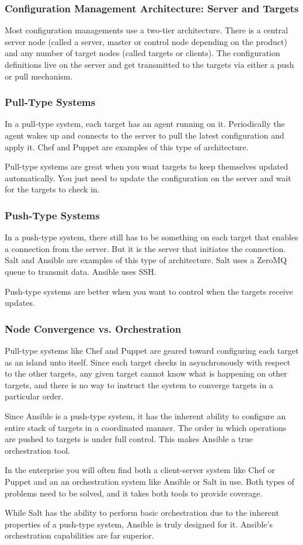 \documentclass[helvetica,english,utf8,notitle,nologo]{beamer}
\begin{document}
\begin{frame}
  \frametitle{Configuration Management Architecture: Server and Targets}

  Most configuration managements use a two-tier architecture. There is
  a central server node (called a server, master or control node
  depending on the product) and any number of target nodes (called
  targets or clients). The configuration definitions live on the
  server and get transmitted to the targets via either a push or pull
  mechanism.
\end{frame}

\begin{frame}
  \frametitle{Pull-Type Systems}

  In a pull-type system, each target has an agent running on
  it. Periodically the agent wakes up and connects to the server to
  pull the latest configuration and apply it. Chef and Puppet are
  examples of this type of architecture.

  Pull-type systems are great when you want targets to keep themselves
  updated automatically. You just need to update the configuration on
  the server and wait for the targets to check in.
\end{frame}

\begin{frame}
  \frametitle{Push-Type Systems}
  
  In a push-type system, there still has to be something on each
  target that enables a connection from the server. But it is the
  server that initiates the connection. Salt and Ansible are examples
  of this type of architecture. Salt uses a ZeroMQ queue to
  transmit data. Ansible uses SSH.

  Push-type systems are better when you want to control when the
  targets receive updates.
\end{frame}

\begin{frame}
  \frametitle{Node Convergence vs. Orchestration}

  Pull-type systems like Chef and Puppet are geared toward configuring
  each target as an island unto itself. Since each target checks in
  asynchronously with respect to the other targets, any given target
  cannot know what is happening on other targets, and there is no way
  to instruct the system to converge targets in a particular order.

  Since Ansible is a push-type system, it has the inherent ability to
  configure an entire stack of targets in a coordinated manner. The
  order in which operations are pushed to targets is under full
  control. This makes Ansible a true orchestration tool.

  In the enterprise you will often find both a client-server system
  like Chef or Puppet and an an orchestration system like Ansible or
  Salt in use. Both types of problems need to be solved, and it takes
  both tools to provide coverage.

  While Salt has the ability to perform basic orchestration due to the
  inherent properties of a push-type system, Ansible is truly designed
  for it. Ansible's orchestration capabilities are far superior.
\end{frame}
\end{document}
